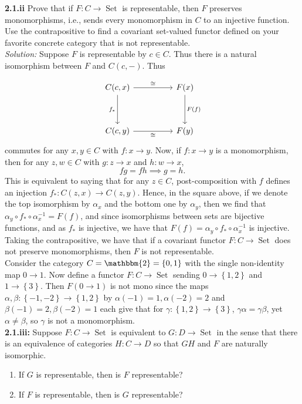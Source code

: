 \documentclass[a4paper]{article}
\DeclareMathOperator{\Set}{Set}
\begin{document}
    \textbf{2.1.ii} Prove that if $F  \colon C \to \Set$ is representable, then
    $F$ preserves monomorphisms, i.e., sends every monomorphism in $C$ to an
    injective function. Use the contrapositive to find a covariant set-valued
    functor defined on your favorite concrete category that is not
    representable.\\
    \linebreak
    \textit{Solution:} Suppose $F$ is representable by $c \in C$. Thus there
    is a natural isomorphism between $F$ and
    $C(c,-)$. Thus
    
    \[\begin{tikzcd}
	{C(c,x)} && {F(x)} \\
	\\
	{C(c,y)} && {F(y)}
	\arrow["{F(f)}", from=1-3, to=3-3]
	\arrow["{f_*}"', from=1-1, to=3-1]
	\arrow["\cong", from=1-1, to=1-3]
	\arrow["\cong"', from=3-1, to=3-3]
\end{tikzcd}\]
commutes for any $x,y \in C$ with $f  \colon x\to y$. Now, if
$f  \colon x\to y$ is a monomorphism, then for any
$z,w \in C$ with $g  \colon z\to x$ and $h  \colon w \to x$,
\[
fg = fh \implies g=h.
\] 
This is equivalent to saying that for any
$z \in C$, post-composition with $f$ defines an injection
$f_*  \colon C(z,x) \to C(z,y)$. Hence, in the square above, if
we denote the top isomorphism by $\alpha_x$ and the bottom one by
$\alpha_y$, then we find that
$\alpha_y \circ f_* \circ \alpha_x^{-1} = F(f)$, and since isomorphisms between
sets are bijective functions, and as $f_*$ is injective, we have that
$F(f) = \alpha_y \circ f_* \circ \alpha_x^{-1}$ is injective.\\
Taking the contrapositive, we have that if a covariant functor
$F  \colon C \to \Set$ does not preserve monomorphisms, then
$F$ is not representable.\\
\linebreak
Consider the category $C = \mathbbm{2} = \left\{ 0,1 \right\} $ with the single
non-identity map $0 \to 1$. Now define a functor
$F  \colon C \to \Set$ sending $0 \to \left\{ 1,2 \right\} $ and
$1 \to \left\{ 3 \right\} $. Then $F(0\to 1)$ is not mono since
the maps $\alpha, \beta  \colon \left\{ -1,-2 \right\} \to \left\{ 1,2 \right\}
$ by
$\alpha (-1) = 1, \alpha(-2) = 2$ and $\beta (-1) = 2, \beta(-2) = 1$ each give
that for  $\gamma  \colon \left\{ 1,2 \right\} \to \left\{ 3 \right\} $,
$\gamma \alpha = \gamma \beta$, yet $\alpha \neq  \beta$, so
$\gamma$ is not a monomorphism.\\
\linebreak
\textbf{2.1.iii:} Suppose $F  \colon C \to \Set$ is equivalent to $G
 \colon D \to \Set$ in the sense that there is an equivalence of categories
 $H  \colon C \to D$ so that $GH$ and $F$ are naturally isomorphic.\\
 \begin{enumerate}[label=(\roman*)]
     \item If $G$ is representable, then is $F$ representable?
     \item If $F$ is representable, then is $G$ representable?
 \end{enumerate}
\end{document}
